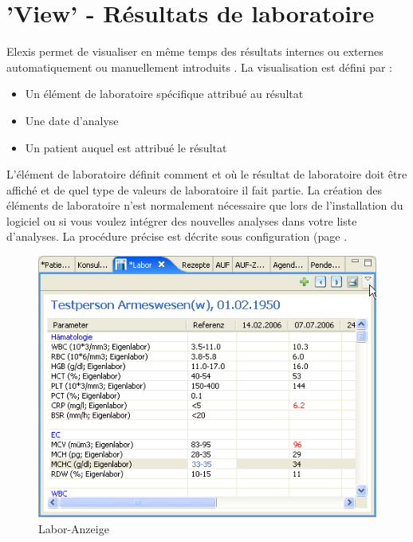 
\section{'View' - Résultats de laboratoire}
Elexis permet de visualiser en même temps des résultats internes ou externes automatiquement ou manuellement introduits .
La visualisation est défini par :
\begin{itemize}
  \item Un élément de laboratoire spécifique attribué au résultat
  \item Une date d'analyse
  \item Un patient auquel est attribué le résultat
\end{itemize}

L'élément de laboratoire définit comment et où le résultat de laboratoire doit être affiché et de quel type de valeurs de laboratoire il fait partie. La création des éléments de laboratoire n'est normalement nécessaire que lors de l'installation du logiciel ou si vous voulez intégrer des nouvelles analyses dans votre liste d'analyses.
La procédure précise est décrite sous configuration
 (page \pageref{config:labor}.

\begin{figure}[htp]
\begin{center}
  \includegraphics{images/labview}
  \caption{Labor-Anzeige}
  \label{fig:labview}
\end{center}
\end{figure}

